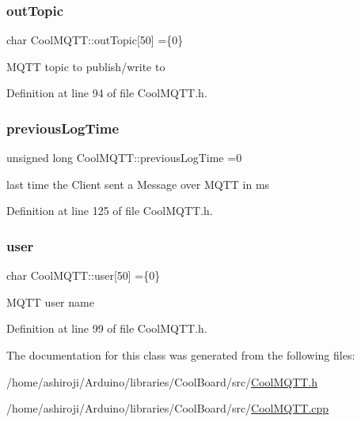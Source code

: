 \mbox{\label{class_cool_m_q_t_t_a109c786a17b463f9eeba046194279522}} 
\subsubsection{\texorpdfstring{out\+Topic}{outTopic}}
{\footnotesize\ttfamily char Cool\+M\+Q\+T\+T\+::out\+Topic\mbox{[}50\mbox{]} =\{\textquotesingle{}0\textquotesingle{}\}\hspace{0.3cm}{\ttfamily [private]}}

M\+Q\+TT topic to publish/write to 

Definition at line 94 of file Cool\+M\+Q\+T\+T.\+h.

\mbox{\label{class_cool_m_q_t_t_a3db37ef9ed3b05b2a8d44edba0e7d3cc}} 
\subsubsection{\texorpdfstring{previous\+Log\+Time}{previousLogTime}}
{\footnotesize\ttfamily unsigned long Cool\+M\+Q\+T\+T\+::previous\+Log\+Time =0\hspace{0.3cm}{\ttfamily [private]}}

last time the Client sent a Message over M\+Q\+TT in ms 

Definition at line 125 of file Cool\+M\+Q\+T\+T.\+h.

\mbox{\label{class_cool_m_q_t_t_a8cd47e45d457f908d4b4390b35aaee83}} 
\subsubsection{\texorpdfstring{user}{user}}
{\footnotesize\ttfamily char Cool\+M\+Q\+T\+T\+::user\mbox{[}50\mbox{]} =\{\textquotesingle{}0\textquotesingle{}\}\hspace{0.3cm}{\ttfamily [private]}}

M\+Q\+TT user name 

Definition at line 99 of file Cool\+M\+Q\+T\+T.\+h.



The documentation for this class was generated from the following files\+:\begin{DoxyCompactItemize}
\item 
/home/ashiroji/\+Arduino/libraries/\+Cool\+Board/src/\hyperlink{_cool_m_q_t_t_8h}{Cool\+M\+Q\+T\+T.\+h}\item 
/home/ashiroji/\+Arduino/libraries/\+Cool\+Board/src/\hyperlink{_cool_m_q_t_t_8cpp}{Cool\+M\+Q\+T\+T.\+cpp}\end{DoxyCompactItemize}
